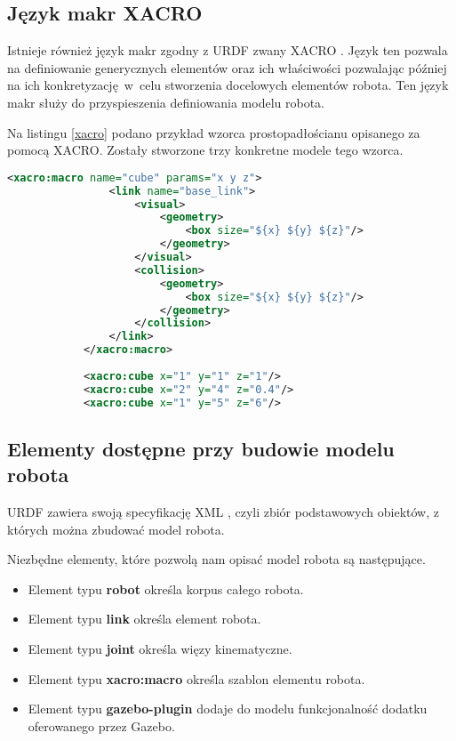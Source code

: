 {    \subsection{Język makr XACRO}
    {
         Istnieje również język makr zgodny z URDF zwany XACRO \cite{xacro}. Język ten pozwala na definiowanie generycznych elementów oraz ich właściwości pozwalając później na ich konkretyzację~w~celu stworzenia docelowych elementów robota. Ten język makr służy do przyspieszenia definiowania modelu robota.
         
         Na listingu \ref{xacro} podano przykład wzorca prostopadłościanu opisanego za pomocą XACRO. Zostały stworzone trzy konkretne modele tego wzorca.

         \vspace{2mm}
         
         \begin{lstlisting}[language=xml, caption=Przykładowy plik XACRO z definicją szablonu prostego elementu, label=xacro]
             <xacro:macro name="cube" params="x y z">
                <link name="base_link">
                    <visual>
                        <geometry>
                            <box size="${x} ${y} ${z}"/>
                        </geometry>
                    </visual>
                    <collision>
                        <geometry>
                            <box size="${x} ${y} ${z}"/>
                        </geometry>
                    </collision>
                </link>
            </xacro:macro>
            
            <xacro:cube x="1" y="1" z="1"/>
            <xacro:cube x="2" y="4" z="0.4"/>
            <xacro:cube x="1" y="5" z="6"/>
         \end{lstlisting}
    }
    
    \subsection{Elementy dostępne przy budowie modelu robota}
    {
        URDF zawiera swoją specyfikację XML \cite{urdf_xml}, czyli zbiór podstawowych obiektów, z których można zbudować model robota. 
        
        Niezbędne elementy, które pozwolą nam opisać model robota są następujące.
        \begin{itemize}
            \item Element typu \textbf{robot} określa korpus całego robota.
            \item Element typu \textbf{link} określa element robota.
            \item Element typu \textbf{joint} określa więzy kinematyczne.
            \item Element typu \textbf{xacro:macro} określa szablon elementu robota.
            \item Element typu \textbf{gazebo-plugin} dodaje do modelu funkcjonalność dodatku oferowanego przez Gazebo.
        \end{itemize}
    }
}